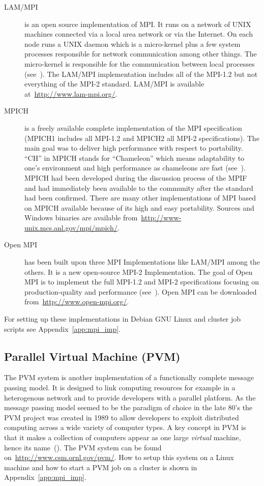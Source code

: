 \begin{description}
\item[LAM/MPI] is an open source implementation of MPI. It runs on a
  network of UNIX machines connected via a local area network or via
  the Internet. On each node runs a UNIX daemon which is a
  micro-kernel plus a few system processes responsible for network
  communication among other things. The micro-kernel is
  responsible for the communication between local processes
  (see~\cite{burns94lam}). The LAM/MPI implementation includes all of
  the MPI-1.2 but not everything of the MPI-2 standard. LAM/MPI is
  available at~\url{http://www.lam-mpi.org/}.
\item[MPICH] is a freely available complete implementation of the MPI
  specification (MPICH1 includes all MPI-1.2 and MPICH2 all MPI-2
  specifications). The main goal was to deliver high performance with
  respect to portability. ``CH'' in MPICH stands for ``Chameleon''
  which means adaptability to one's environment and high performance
  as chameleons are fast (see~\cite{gropp96mpich}). MPICH had been
  developed during the discussion process of the MPIF and had immediately been
  available to the community after the standard had been
  confirmed. There are many other implementations of MPI based on MPICH
  available because of its high and easy portability. Sources and
  Windows binaries are available
  from~\url{http://www-unix.mcs.anl.gov/mpi/mpich/}.
\item[Open MPI] has been built upon three MPI Implementations like
  LAM/MPI among the others. It is a new open-source MPI-2
  Implementation. The goal of Open MPI is to implement the full
  MPI-1.2 and MPI-2 specifications focusing on production-quality and
  performance (see~\cite{gabriel04:_open_mpi}). Open MPI can be
  downloaded from~\url{http://www.open-mpi.org/}.
\end{description}

For setting up these implementations in Debian GNU Linux and cluster
job scripts see Appendix~\ref{app:mpi_imp}. 

\subsection{Parallel Virtual Machine (PVM)}
\label{sec:PVM}

The PVM system is another implementation of a functionally
complete message passing model. It is designed to link computing
resources for example in a heterogenous network and to provide
developers with a parallel platform. As the message passing model
seemed to be the paradigm of choice in the late 80's the PVM project
was created in 1989 to allow developers to exploit distributed
computing across a wide variety of computer types. A key concept in
PVM is that it makes a collection of computers appear as one large
\textit{virtual} machine, hence its name~(\cite{geist94pvm}). The PVM
system can be found on~\url{http://www.csm.ornl.gov/pvm/}. How to
setup this system on a Linux machine and how to start a PVM job on a
cluster is shown in Appendix~\ref{app:mpi_imp}.


